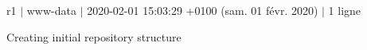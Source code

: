 r1 $\vert$ www-\/data $\vert$ 2020-\/02-\/01 15\+:03\+:29 +0100 (sam. 01 févr. 2020) $\vert$ 1 ligne

Creating initial repository structure 